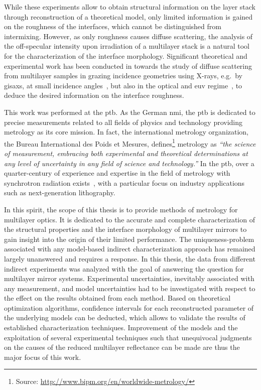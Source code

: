 While these experiments allow to obtain structural information on the layer
stack through reconstruction of a theoretical model, only limited information is
gained on the roughness of the interfaces, which cannot be distinguished from
intermixing.
However, as only roughness causes diffuse scattering, the analysis of the
off-specular intensity upon irradiation of a multilayer stack is a natural tool
for the characterization of the interface morphology.
Significant theoretical and experimental work has been conducted in towards the
study of diffuse scattering from multilayer samples in grazing incidence
geometries using X-rays, e.g.~by \gls{gisaxs}, at small incidence
angles~\cite{mikulik_x-ray_1997, sinha_x-ray_1994, de_boer_x-ray_1995,
de_boer_x-ray_1996, salditt_kinetic_1994,
levine_grazing-incidence_1989,siffalovic_characterization_2009}, but also in the
optical and \gls{euv} regime~\cite{amra_light_1993, amra_light_1994,
elson_light_1980, elson_relationship_1983, schroder_angle-resolved_2011,
schroder_spectral_2014}, to deduce the desired information on the interface
roughness.

This work was performed at the \gls{ptb}.
As the German \gls{nmi}, the \gls{ptb} is dedicated to precise measurements
related to all fields of physics and technology providing metrology as its core
mission.
In fact, the international metrology organization, the Bureau International des
Poids et Mesures, defines\footnote{Source:
\url{http://www.bipm.org/en/worldwide-metrology/}} metrology as \emph{``the
science of measurement, embracing both experimental and theoretical
determinations at any level of uncertainty in any field of science and
technology.''}
In the \gls{ptb}, over a quarter-century of experience and expertise in the
field of metrology with synchrotron radiation
exists~\cite{beckhoff_quarter-century_2009}, with a particular focus on industry
applications such as next-generation lithography.

In this spirit, the scope of this thesis is to provide methods
of metrology for multilayer optics.
It is dedicated to the accurate and complete characterization of the structural
properties and the interface morphology of multilayer mirrors to gain insight
into the origin of their limited performance.
The uniqueness-problem associated with any model-based indirect characterization
approach has remained largely unanswered and requires a response.
In this thesis, the data from different indirect experiments was analyzed with
the goal of answering the question for multilayer mirror systems.
Experimental uncertainties, inevitably associated with any measurement, and
model uncertainties had to be investigated with respect to the effect on the
results obtained from each method.
Based on theoretical optimization algorithms, confidence intervals for each
reconstructed parameter of the underlying models can be deducted, which allows
to validate the results of established characterization techniques.
Improvement of the models and the exploitation of several experimental
techniques such that unequivocal judgments on the causes of the reduced
multilayer reflectance can be made are thus the major focus of this work.

